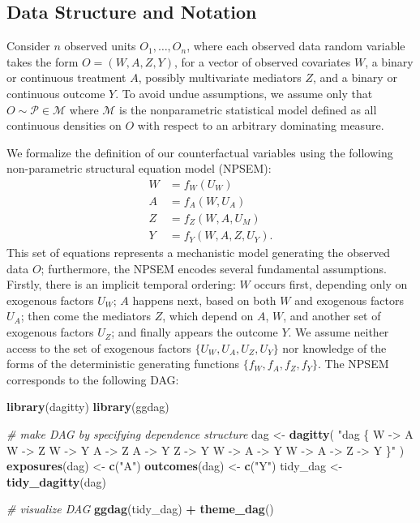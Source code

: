 \documentclass[12pt, krantz2,]{krantz}
\newenvironment{Shaded}{\begin{snugshade}}{\end{snugshade}}
\newcommand{\CommentTok}[1]{\textcolor[rgb]{0.37,0.37,0.37}{\textit{#1}}}
\newcommand{\KeywordTok}[1]{\textcolor[rgb]{0.27,0.27,0.27}{\textbf{#1}}}
\newcommand{\NormalTok}[1]{#1}
\newcommand{\OperatorTok}[1]{\textcolor[rgb]{0.43,0.43,0.43}{\textbf{#1}}}
\newcommand{\StringTok}[1]{\textcolor[rgb]{0.5,0.5,0.5}{#1}}
\theoremstyle{definition}
\theoremstyle{definition}
\theoremstyle{definition}
\newcommand{\M}{\mathcal{M}}
\newcommand{\1}{\mathbbm{1}}
\begin{document}
\hypertarget{data-structure-and-notation}{%
\subsection{Data Structure and Notation}\label{data-structure-and-notation}}

Consider \(n\) observed units \(O_1, \ldots, O_n\), where each observed data random
variable takes the form \(O = (W, A, Z, Y)\), for a vector of observed covariates
\(W\), a binary or continuous treatment \(A\), possibly multivariate mediators \(Z\),
and a binary or continuous outcome \(Y\). To avoid undue assumptions, we assume
only that \(O \sim \mathcal{P} \in \M\) where \(\M\) is the nonparametric
statistical model defined as all continuous densities on \(O\) with respect to an
arbitrary dominating measure.

We formalize the definition of our counterfactual variables using the following
non-parametric structural equation model (NPSEM):
\begin{align}
  W &= f_W(U_W) \\
  A &= f_A(W, U_A) \\
  Z &= f_Z(W, A, U_M) \\
  Y &= f_Y(W, A, Z, U_Y).
  \label{eq:npsem-mediate}
\end{align}
This set of equations
represents a mechanistic model generating the observed data \(O\); furthermore,
the NPSEM encodes several fundamental assumptions. Firstly, there is an implicit
temporal ordering: \(W\) occurs first, depending only on exogenous factors \(U_W\);
\(A\) happens next, based on both \(W\) and exogenous factors \(U_A\); then come the
mediators \(Z\), which depend on \(A\), \(W\), and another set of exogenous factors
\(U_Z\); and finally appears the outcome \(Y\). We assume neither access to the set
of exogenous factors \(\{U_W, U_A, U_Z, U_Y\}\) nor knowledge of the forms of the
deterministic generating functions \(\{f_W, f_A, f_Z, f_Y\}\). The NPSEM
corresponds to the following DAG:

\begin{Shaded}
\begin{Highlighting}[]
\KeywordTok{library}\NormalTok{(dagitty)}
\KeywordTok{library}\NormalTok{(ggdag)}

\CommentTok{# make DAG by specifying dependence structure}
\NormalTok{dag <-}\StringTok{ }\KeywordTok{dagitty}\NormalTok{(}
  \StringTok{"dag \{}
\StringTok{    W -> A}
\StringTok{    W -> Z}
\StringTok{    W -> Y}
\StringTok{    A -> Z}
\StringTok{    A -> Y}
\StringTok{    Z -> Y}
\StringTok{    W -> A -> Y}
\StringTok{    W -> A -> Z -> Y}
\StringTok{  \}"}
\NormalTok{)}
\KeywordTok{exposures}\NormalTok{(dag) <-}\StringTok{ }\KeywordTok{c}\NormalTok{(}\StringTok{"A"}\NormalTok{)}
\KeywordTok{outcomes}\NormalTok{(dag) <-}\StringTok{ }\KeywordTok{c}\NormalTok{(}\StringTok{"Y"}\NormalTok{)}
\NormalTok{tidy_dag <-}\StringTok{ }\KeywordTok{tidy_dagitty}\NormalTok{(dag)}

\CommentTok{# visualize DAG}
\KeywordTok{ggdag}\NormalTok{(tidy_dag) }\OperatorTok{+}
\StringTok{  }\KeywordTok{theme_dag}\NormalTok{()}
\end{Highlighting}
\end{Shaded}
\end{document}
